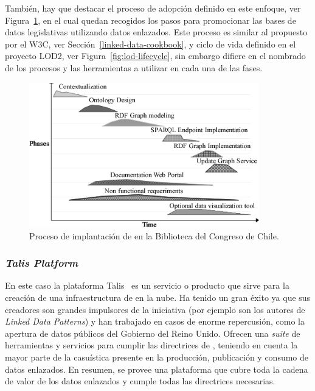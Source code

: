 También, hay que destacar el proceso de adopción definido en este enfoque, ver Figura~\ref{fig:bcn-proceso}, en el cual
quedan recogidos los pasos para promocionar las bases de datos legislativas utilizando datos enlazados. Este proceso
es similar al propuesto por el \gls{W3C}, ver Sección~\ref{linked-data-cookbook}, y ciclo de vida definido en el proyecto LOD2, ver Figura~\ref{fig:lod-lifecycle}, sin embargo 
difiere en el nombrado de los procesos y las herramientas a utilizar en cada una de las fases.

\begin{figure}[!htb]
\centering
	\includegraphics[width=10cm]{images/phd/process}
\caption{Proceso de implantación de \linkeddata en la Biblioteca del Congreso de Chile.}
\label{fig:bcn-proceso}
\end{figure}



\subsubsection{\textit{Talis Platform}}
En este caso la plataforma Talis~\cite{talis} es un servicio o producto que sirve para la creación de una
infraestructura de \linkeddata en la nube. Ha tenido un gran éxito ya que sus creadores son grandes
impulsores de la iniciativa (por ejemplo son los autores de \textit{Linked Data Patterns}) y han trabajado
en casos de enorme repercusión, como la apertura de datos públicos del Gobierno del Reino Unido. Ofrecen 
 una \textit{suite} de herramientas y servicios para cumplir las directrices de \linkeddata, teniendo en cuenta 
la mayor parte de la casuística presente en la producción, publicación y consumo de datos enlazados. En resumen, se provee una plataforma
que cubre toda la cadena de valor de los datos enlazados y cumple todas las directrices necesarias.

